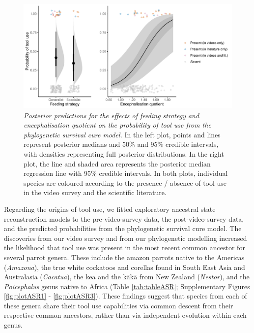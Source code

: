 \documentclass[
  man,floatsintext]{apa6}
\begin{document}
\begin{figure}
\centering
\includegraphics{manuscript_files/figure-latex/plotSurvCure4-1.pdf}
\caption{\label{fig:plotSurvCure4}\emph{Posterior predictions for the effects of feeding strategy and encephalisation quotient on the probability of tool use from the phylogenetic survival cure model.} In the left plot, points and lines represent posterior medians and 50\% and 95\% credible intervals, with densities representing full posterior distributions. In the right plot, the line and shaded area represents the posterior median regression line with 95\% credible intervals. In both plots, individual species are coloured according to the presence / absence of tool use in the video survey and the scientific literature.}
\end{figure}

Regarding the origins of tool use, we fitted exploratory ancestral state reconstruction models to the pre-video-survey data, the post-video-survey data, and the predicted probabilities from the phylogenetic survival cure model. The discoveries from our video survey and from our phylogenetic modelling increased the likelihood that tool use was present in the most recent common ancestor for several parrot genera. These include the amazon parrots native to the Americas (\emph{Amazona}), the true white cockatoos and corellas found in South East Asia and Australasia (\emph{Cacatua}), the kea and the kākā from New Zealand (\emph{Nestor}), and the \emph{Poicephalus} genus native to Africa (Table \ref{tab:tableASR}; Supplementary Figures \ref{fig:plotASR1} - \ref{fig:plotASR3}). These findings suggest that species from each of these genera share their tool use capabilities via common descent from their respective common ancestors, rather than via independent evolution within each genus.
\end{document}
